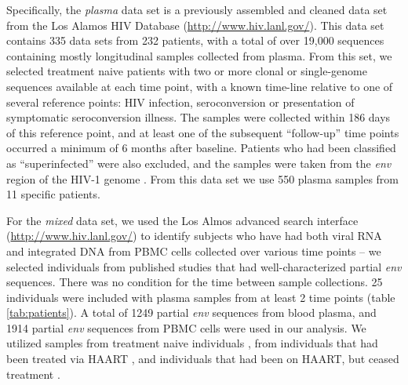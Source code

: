 Specifically, the {\em plasma} data set \citep{McCloskey14} is a previously assembled and cleaned data set from the Los Alamos HIV Database (\href{http://www.hiv.lanl.gov/}{http://www.hiv.lanl.gov/}). 
This data set contains 335 data sets from 232 patients, with a total of over 19,000 sequences \citep{McCloskey14} containing mostly longitudinal samples collected from plasma. 
From this set, we selected treatment naive patients with two or more clonal or single-genome sequences available at each time point, with a known time-line relative to one of several reference points: HIV infection, seroconversion or presentation of symptomatic seroconversion illness. 
The samples were collected within 186 days of this reference point, and at least one of the subsequent ``follow-up'' time points occurred a minimum of 6 months after baseline.
Patients who had been classified as ``superinfected'' were also excluded, and the samples were taken from the {\em env} region of the HIV-1 genome \citep{McCloskey14}. 
From this data set we use 550 plasma samples from 11 specific patients. 


For the {\em mixed} data set, we used the Los Almos advanced search interface (\href{http://www.hiv.lanl.gov/}{http://www.hiv.lanl.gov/}) to identify subjects who have had both viral RNA and integrated DNA from PBMC cells collected over various time points -- we selected individuals from published studies that had well-characterized partial {\em env} sequences. 
There was no condition for the time between sample collections. 
25 individuals were included with plasma samples from at least 2 time points (table \ref{tab:patients}).
A total of 1249 partial {\em env} sequences from blood plasma, and 1914 partial {\em env} sequences from PBMC cells were used in our analysis. 
We utilized samples from treatment naive individuals \citep{Shankarappa99, Novitsky09}, from individuals that had been treated via HAART \citep{Llewellyn06}, and individuals that had been on HAART, but ceased treatment \citep{Fischer04}. 
 
